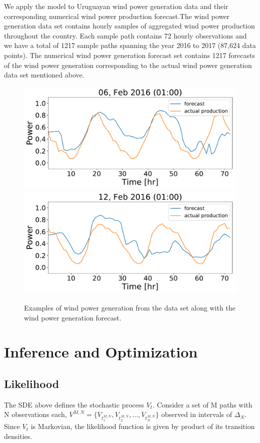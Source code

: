 \documentclass[10pt,twocolumn,letterpaper]{article}
\begin{document}
We apply the model to Uruguayan wind power generation data and their corresponding numerical wind power production forecast.The wind power generation data set contains hourly samples of aggregated wind power production throughout the country. Each sample path contains 72 hourly observations and we have a total of 1217 sample paths spanning the year 2016 to 2017 (87,624 data points). The numerical wind power generation forecast set contains  1217 forecasts of the wind power generation  corresponding to the actual  wind power generation data set mentioned above.

\begin{figure}[t]
\begin{center}
   \includegraphics[width=0.8\linewidth]{Forecast_data_68.pdf}
    \includegraphics[width=0.8\linewidth]{Forecast_data_82.pdf}
\end{center}
   \caption{Examples of wind power generation from the data set along with the wind power generation forecast.}
\label{fig:long}
\label{fig:onecol}
\end{figure}

\section{Inference and Optimization}

\subsection{Likelihood}
The SDE above defines the stochastic process $V_t$. Consider a set of M paths with N observations each, $ V^{M,N}=\{ V_{t_1^{M,N}} , V_{t_2^{M,N}} ,\ldots , V_{t_N^{M,N}} \}$ observed in intervals of $\Delta_N$. Since $V_t$ is Markovian, the likelihood function is given by  product of its  transition densities.
\end{document}
